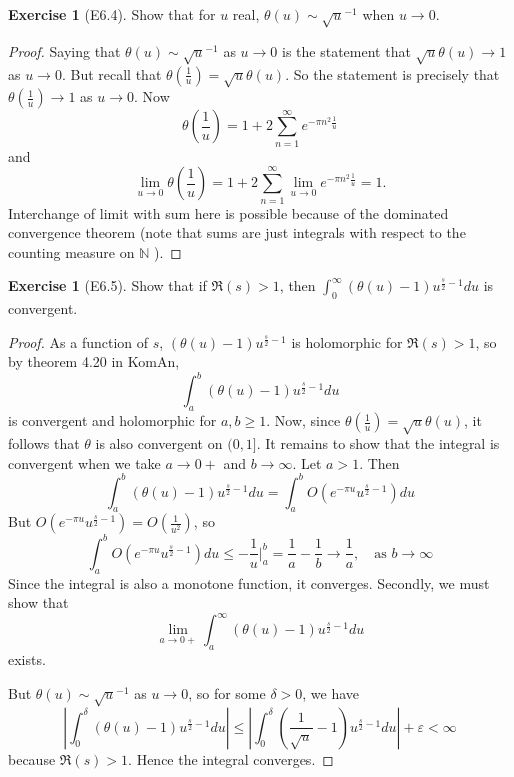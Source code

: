 \documentclass[reqno]{amsart}
\theoremstyle{definition}
\newtheorem{exercise}[theorem]{Exercise}
\theoremstyle{remark}
\begin{document}
\begin{exercise}[E6.4]
    Show that for $u$ real,
    $\theta (u) \sim 
    \sqrt{u}^{-1} $ when $u \to 0$.
\end{exercise}

\begin{proof}
    Saying that $\theta(u) \sim 
    \sqrt{u}^{-1} $ as $u \to 0$ is the statement that
    $\sqrt{u} \theta (u) \to 1$ as $u \to 0$. But
    recall that
    $\theta (\frac{1}{u}) = 
    \sqrt{u} \theta (u)$. So the statement is
    precisely that
    $\theta \left( \frac{1}{u} \right) \to 1$ as
    $u \to 0$. Now
    \[
    \theta \left( \frac{1}{u} \right) 
    =1+ 2 \sum_{n=1}^{\infty} e^{-\pi n^2 \frac{1}{u}}
    \] 
    and
    \[
    \lim_{u \to 0} \theta \left( \frac{1}{u} \right) 
    = 1+ 2 \sum_{n=1}^{\infty} \lim_{u \to 0}
    e^{- \pi n^2 \frac{1}{u}}
    = 1.
    \] 
    Interchange of limit with sum here
    is possible because of the dominated convergence theorem
    (note that sums are just integrals with respect to the
    counting measure on $\mathbb{N} $ ).
\end{proof}


\begin{exercise}[E6.5]
    Show that if $\Re(s) > 1$, then
    $\int_{0}^{\infty} \left( \theta(u)-1 \right) 
    u^{\frac{s}{2}-1} du$ is convergent.
\end{exercise}

\begin{proof}
    As a function of $s$,
    $\left( \theta (u)-1 \right) 
    u^{\frac{s}{2}-1}$ is holomorphic for
    $\Re (s) > 1$, so by theorem 4.20 in KomAn,
    \[
    \int_{a}^{b} \left( \theta (u)-1 \right) u^{\frac{s}{2}-1}du
    \] 
    is convergent and holomorphic for
    $a,b \ge  1$. Now, since
    $\theta (\frac{1}{u}) = \sqrt{u} \theta(u)$, it
    follows that $\theta$ is also convergent
    on $(0,1]$.
    It remains to show that the integral is convergent when we take
    $a\to 0+$ and $b \to \infty$.
    Let $a > 1$. Then
    \[
    \int_{a}^{b} \left( \theta (u)-1 \right) 
    u^{\frac{s}{2}-1} du
    =\int_{a}^{b} O \left( e^{-\pi u} u^{\frac{s}{2}-1} \right) du 
    \] 
    But
    $O \left( e^{-\pi u}u^{\frac{s}{2}-1} \right) 
    = O \left( \frac{1}{u^2} \right) $, so
    \[
    \int_{a}^{b} O \left( e^{-\pi u}u^{\frac{s}{2}-1} \right) du
    \le - \frac{1}{u} \bigg|_{a}^{b}
    = \frac{1}{a}- \frac{1}{b}
    \to \frac{1}{a}, \quad \text{as } b\to \infty
    \] 
    Since the integral is also a monotone function, it converges.
    Secondly, we must show that
    \[
    \lim_{a \to 0+} \int_{a}^{\infty}  
    \left( \theta (u)-1 \right) u^{\frac{s}{2}-1} du
    \] 
    exists.

    But $\theta (u) \sim \sqrt{u}^{-1} $ as $u \to 0$, so
    for some $\delta > 0$, we have
    \[
    \left| \int_{0}^{\delta} \left( \theta(u)-1 \right) 
    u^{\frac{s}{2}-1} du \right| 
    \le \left| \int_{0}^{\delta} 
    \left( \frac{1}{\sqrt{u} } - 1 \right) 
    u^{\frac{s}{2}-1} du\right| + \varepsilon
    < \infty
    \] 
    because $\Re (s) > 1$.
    Hence the integral converges.
\end{proof}
\end{document}

